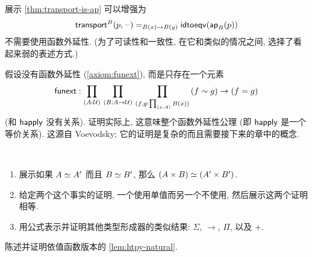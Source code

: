 \begin{ex}
    \label{ex:strengthen-transport-is-ap}
    展示 \cref{thm:transport-is-ap} 可以增强为
    \[\mathsf{transport}^{B}(p,{\mathord{\hspace{1pt}\text{--}\hspace{1pt}}}) =_{B(x)\to B(y)} \mathsf{idtoeqv}(\mathsf{ap}_{B}(p))\]
    不需要使用函数外延性.
    (为了可读性和一致性, 在它和类似的情况之间, 选择了看起来弱的表述方式.)
\end{ex}

\begin{ex}
    \label{ex:strong-from-weak-funext}
    假设没有函数外延性 (\cref{axiom:funext}), 而是只存在一个元素
    \[ \funext : \prd{A:\UU}{B:A\to \UU}{f,g:\prd{x:A} B(x)} (f\htpy g) \to (f=g) \]
    (和 $\mathsf{happly}$ 没有关系).
    证明实际上, 这意味整个函数外延性公理 (即 $\mathsf{happly}$ 是一个等价关系).
    这源自 Voevodsky; 它的证明是复杂的而且需要接下来的章中的概念.
\end{ex}

\begin{ex}
    \label{ex:equiv-functor-types}\
    \begin{enumerate}
        \item 展示如果 $A \simeq A'$  而且 $B \simeq B'$, 那么 $(A\times B) \simeq (A'\times B')$.
        \item 给定两个这个事实的证明, 一个使用单值而另一个不使用, 然后展示这两个证明相等.
        \item 用公式表示并证明其他类型形成器的类似结果: $\Sigma$, $\to$, $\Pi$, 以及 $+$.
    \end{enumerate}
\end{ex}

\begin{ex}
    \label{ex:dep-htpy-natural}
    陈述并证明依值函数版本的 \cref{lem:htpy-natural}.
\end{ex}
